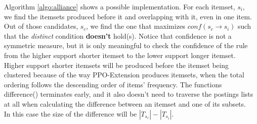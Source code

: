 \documentclass{sig-alternate}
\begin{document}
Algorithm  \ref{algo:alliance}  shows a possible implementation. For each itemset, $s_i$, we find the itemsets produced before it and overlapping with it, even in one item. Out of those candidates, $s_c$, we find the one that maximizes $conf(s_c \rightarrow s_i)$ such that the \emph{distinct} condition \textbf{doesn't} hold(s). Notice that confidence is not a symmetric measure, but it is only meaningful to check the confidence of the rule from the higher support shorter itemset to the lower support longer itemset. Higher support shorter itemsets will be produced before the itemset being clustered because of the way PPO-Extension produces itemsets, when the total ordering follows the descending order of items' frequency. The functions difference() terminates early, and it also doesn't need to traverse the postings lists at all when calculating the difference between an itemset and one of its subsets. In this case the size of the difference will be $|T_{s_c}| - |T_{s_i}|$.
\end{document}
